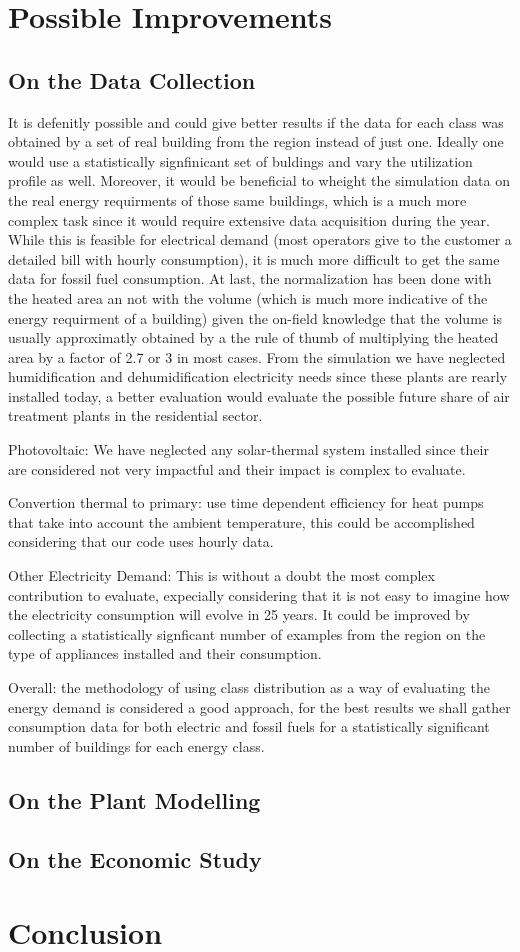 \section{Possible Improvements}
\subsection{On the Data Collection}
It is defenitly possible and could give better results if the data for each class was obtained by a set of real building from the region instead of just one.
Ideally one would use a statistically signfinicant set of buldings and vary the utilization profile as well.
Moreover, it would be beneficial to wheight the simulation data on the real energy requirments of those same buildings,
which is a much more complex task since it would require extensive data acquisition during the year. 
While this is feasible for electrical demand (most operators give to the customer a detailed bill with hourly consumption),
it is much more difficult to get the same data for fossil fuel consumption.
At last, the normalization has been done with the heated area an not with the volume (which is much more indicative of the energy requirment of a building) 
given the on-field knowledge that the volume is usually approximatly obtained by a the rule of thumb of multiplying the heated area by a factor of 2.7 or 3 in most cases.
From the simulation we have neglected humidification and dehumidification electricity needs since these plants are rearly installed today,
a better evaluation would evaluate the possible future share of air treatment plants in the residential sector.

Photovoltaic: We have neglected any solar-thermal system installed since their are considered not very impactful and their impact is complex to evaluate.

Convertion thermal to primary: use time dependent efficiency for heat pumps that take into account the ambient temperature,
this could be accomplished considering that our code uses hourly data.

Other Electricity Demand: This is without a doubt the most complex contribution to evaluate,
expecially considering that it is not easy to imagine how the electricity consumption will evolve in 25 years.
It could be improved by collecting a statistically signficant number of examples from the region on the type of appliances installed and their consumption.

Overall: the methodology of using class distribution as a way of evaluating the energy demand is considered a good approach,
for the best results we shall gather consumption data for both electric and fossil fuels for a statistically significant number of buildings for each energy class.

\subsection{On the Plant Modelling}
\subsection{On the Economic Study}

\section{Conclusion}
